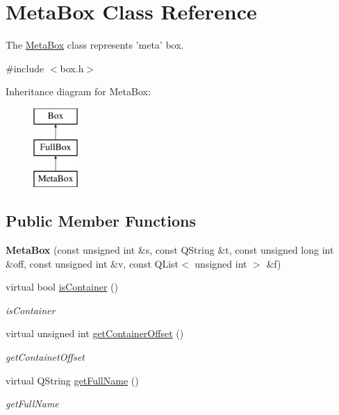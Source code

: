 \hypertarget{class_meta_box}{\section{Meta\-Box Class Reference}
\label{class_meta_box}
}


The \hyperlink{class_meta_box}{Meta\-Box} class represents 'meta' box.  




{\ttfamily \#include $<$box.\-h$>$}

Inheritance diagram for Meta\-Box\-:\begin{figure}[H]
\begin{center}
\leavevmode
\includegraphics[height=3.000000cm]{class_meta_box}
\end{center}
\end{figure}
\subsection*{Public Member Functions}
\begin{DoxyCompactItemize}
\item 
\hypertarget{class_meta_box_afe2a22ed4f01e107ec4ff0affac6db29}{{\bfseries Meta\-Box} (const unsigned int \&s, const Q\-String \&t, const unsigned long int \&off, const unsigned int \&v, const Q\-List$<$ unsigned int $>$ \&f)}\label{class_meta_box_afe2a22ed4f01e107ec4ff0affac6db29}

\item 
virtual bool \hyperlink{class_meta_box_a51ccaec850de68efb454358b2cf37522}{is\-Container} ()
\begin{DoxyCompactList}\small\item\em is\-Container \end{DoxyCompactList}\item 
virtual unsigned int \hyperlink{class_meta_box_a991bcf6b91fbe8f58b37118ccb2f44ca}{get\-Container\-Offset} ()
\begin{DoxyCompactList}\small\item\em get\-Containet\-Offset \end{DoxyCompactList}\item 
virtual Q\-String \hyperlink{class_meta_box_a2d7a7dced50efa9193cdb68a56a59e78}{get\-Full\-Name} ()
\begin{DoxyCompactList}\small\item\em get\-Full\-Name \end{DoxyCompactList}\end{DoxyCompactItemize}
